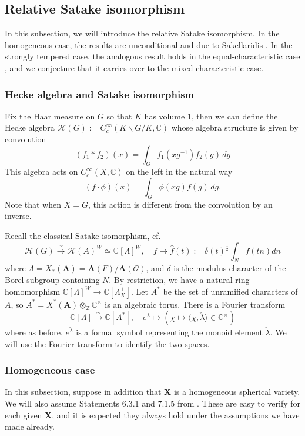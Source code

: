 \documentclass{amsart}
\theoremstyle{definition}
\theoremstyle{remark}
\newcommand{\1}{\mathbf{1}}
\newcommand{\bra}{\langle}
\newcommand{\C}{\mathbb{C}}
\newcommand{\iso}{\xrightarrow{\,\sim\,}}
\newcommand{\ket}{\rangle}
\newcommand{\mb}[1]{\mathbf{#1}}
\newcommand{\Or}{\mathcal{O}}
\newcommand{\sh}[1]{\mathcal{#1}}
\newcommand{\Z}{\mathbb{Z}}
\theoremstyle{definition}
\begin{document}
\subsection{Relative Satake isomorphism}\label{ss:Satake}
In this subsection, we will introduce the relative Satake isomorphism. In the homogeneous case, the results are unconditional and due to Sakellaridis \cite{SakSpherical, SakInvSatake}. In the strongly tempered case, the analogous result holds in the equal-characteristic case \cite{SakWang}, and we conjecture that it carries over to the mixed characteristic case.

\subsubsection{Hecke algebra and Satake isomorphism}\label{ss:Normalization}
Fix the Haar measure on $G$ so that $K$ has volume 1, then we can define the Hecke algebra $\sh{H}(G):=C_c^\infty(K\backslash G/K,\C)$ whose algebra structure is given by convolution
\[
    (f_1\ast f_2)(x)=\int_G f_1(xg^{-1})f_2(g)\,dg
\]
This algebra acts on $C_c^\infty(X,\C)$ on the left in the natural way
\[
    (f\cdot\phi)(x)=\int_G \phi(xg)f(g)\,dg.
\]
Note that when $X=G$, this action is different from the convolution by an inverse.

Recall the classical Satake isomorphism, cf.~\cite{GrossSatake}
\begin{equation}\label{eqn:Satake}
    \sh{H}(G)\iso\sh{H}(A)^W\simeq\C[\Lambda]^W,\quad f\mapsto\hat{f}(t):=\delta(t)^{\frac{1}{2}}\int_N f(tn)dn
\end{equation}
where $\Lambda=X_*(\mb{A})=\mb{A}(F)/\mb{A}(\Or)$, and $\delta$ is the modulus character of the Borel subgroup containing $N$. By restriction, we have a natural ring homomorphism $\C[\Lambda]^W\to\C[\Lambda_X^+]$. Let $A^*$ be the set of unramified characters of $A$, so $A^*=X^*(\mb{A})\otimes_\Z\C^\times$ is an algebraic torus. There is a Fourier transform
\begin{equation}\label{eqn:Fourier}
    \C[\Lambda]\iso\C[A^*],\quad e^{\check{\lambda}}\mapsto (\chi\mapsto\bra\chi,\check{\lambda}\ket\in\C^\times)
\end{equation}
where as before, $e^{\check{\lambda}}$ is a formal symbol representing the monoid element $\check{\lambda}$. We will use the Fourier transform to identify the two spaces.

\subsubsection{Homogeneous case}\label{ss:HomogeneousCase}
In this subsection, suppose in addition that $\mb{X}$ is a homogeneous spherical variety. We will also assume Statements 6.3.1 and 7.1.5 from \cite{SakSpherical}. These are easy to verify for each given $\mb{X}$, and it is expected they always hold under the assumptions we have made already.
\end{document}
